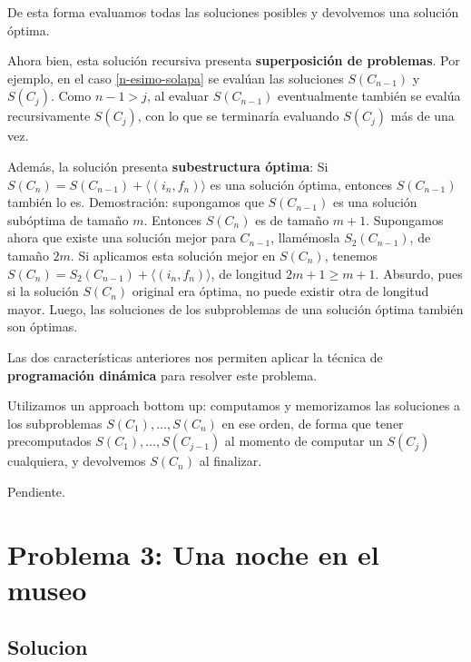 \documentclass[a4paper,10pt,twoside]{article}
\newenvironment{pseudo}[1][]{%
    \vspace{0.5em}%
    \begin{algorithmic}%
}
{%
    \end{algorithmic}%
    \vspace{0.5em}%
}
\begin{document}
De esta forma evaluamos todas las soluciones posibles y devolvemos una solución óptima.

Ahora bien, esta solución recursiva presenta \textbf{superposición de problemas}. Por ejemplo, en el caso \ref{n-esimo-solapa} se evalúan las soluciones $S(C_{n-1})$ y $S(C_j)$. Como $n - 1 > j$, al evaluar $S(C_{n-1})$ eventualmente también se evalúa recursivamente $S(C_j)$, con lo que se terminaría evaluando $S(C_j)$ más de una vez.

Además, la solución presenta \textbf{subestructura óptima}: Si $S(C_n) = S(C_{n-1}) + \langle (i_n, f_n) \rangle$ es una solución óptima, entonces $S(C_{n-1})$ también lo es. Demostración: supongamos que $S(C_{n-1})$ es una solución subóptima de tamaño $m$. Entonces $S(C_n)$ es de tamaño $m + 1$. Supongamos ahora que existe una solución mejor para $C_{n-1}$, llamémosla $S_2(C_{n-1})$, de tamaño $2m$. Si aplicamos esta solución mejor en $S(C_n)$, tenemos $S(C_n) = S_2(C_{n-1}) + \langle (i_n, f_n) \rangle$, de longitud $2m + 1 \geq m + 1$. Absurdo, pues si la solución $S(C_n)$ original era óptima, no puede existir otra de longitud mayor. Luego, las soluciones de los subproblemas de una solución óptima también son óptimas.

Las dos características anteriores nos permiten aplicar la técnica de \textbf{programación dinámica} para resolver este problema.

Utilizamos un approach bottom up: computamos y memorizamos las soluciones a los subproblemas $S(C_1), \ldots, S(C_n)$ en ese orden, de forma que tener precomputados $S(C_1), \ldots, S(C_{j-1})$ al momento de computar un $S(C_j)$ cualquiera, y devolvemos $S(C_n)$ al finalizar.

\begin{pseudo}
        \State Pendiente.
    \EndProcedure 
\end{pseudo}




\section{Problema 3: Una noche en el museo}

\subsection{Solucion}
\end{document}

